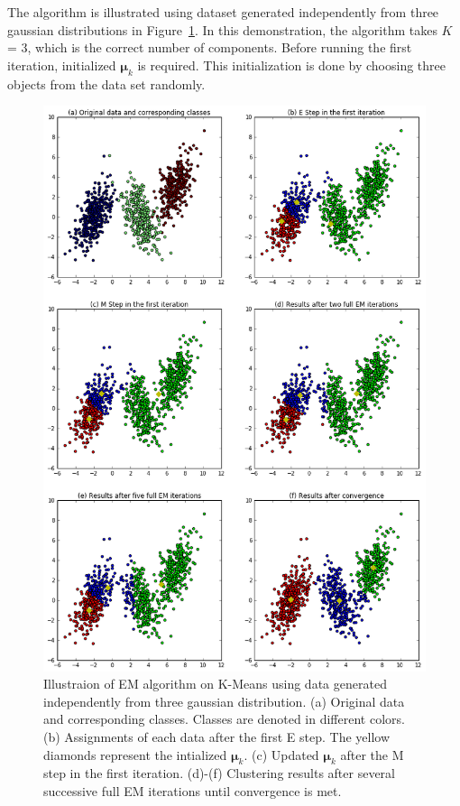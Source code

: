 The algorithm is illustrated using dataset generated independently from three gaussian distributions in Figure~\ref{fig:EM4KMeans}. In this demonstration, the algorithm takes \(K\) = 3, which is the correct number of components. Before running the first iteration, initialized \(\boldsymbol{\mu}_k\) is required. This initialization is done by choosing three objects from the data set randomly.
\begin{figure}[ht]
	\begin{center}
		\includegraphics[width=\textwidth]{images/EM4KMeans.png}
		\caption{Illustraion of EM algorithm on K-Means using data generated independently from three gaussian distribution. (a) Original data and corresponding classes. Classes are denoted in different colors. (b) Assignments of each data after the first E step. The yellow diamonds represent the intialized \(\boldsymbol{\mu}_k\). (c) Updated \(\boldsymbol{\mu}_k\) after the M step in the first iteration. (d)-(f) Clustering results after several successive full EM iterations until convergence is met.}
		\label{fig:EM4KMeans}
	\end{center}
\end{figure}

